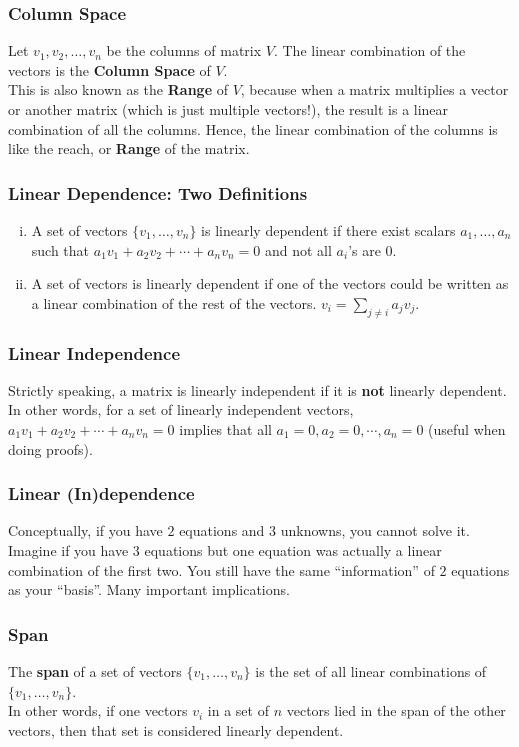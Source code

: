 \documentclass{beamer}
\begin{document}
\begin{frame}
\frametitle{Column Space}
Let $v_1, v_2, \dots, v_n$ be the columns of matrix $V$. The linear combination of the vectors is the \textbf{Column Space} of $V$. \\
This is also known as the \textbf{Range} of $V$, because when a matrix multiplies a vector or another matrix (which is just multiple vectors!), the result is a linear combination of all the columns. Hence, the linear combination of the columns is like the reach, or \textbf{Range} of the matrix.
\end{frame}

\begin{frame}
\frametitle{Linear Dependence: Two Definitions}
\begin{enumerate}[(i)]
\item A set of vectors $\{ v_1, \ldots, v_n \}$ is linearly dependent if there exist scalars $a_1, \ldots, a_n$ such that $a_1 v_1 + a_2 v_2 + \cdots + a_n v_n = 0$ and not all $a_i$'s are $0$.
\item A set of vectors is linearly dependent if one of the vectors could be written as a linear combination of the rest of the vectors. $v_i = \sum_{j \neq i} a_j v_j$.
\end{enumerate}
\end{frame}

\begin{frame}
\frametitle{Linear Independence}
Strictly speaking, a matrix is linearly independent if it is \textbf{not} linearly dependent.\\
In other words, for a set of linearly independent vectors, $a_1 v_1 + a_2 v_2 + \cdots + a_n v_n = 0$ implies that all $a_1 = 0, a_2 = 0, \cdots , a_n = 0$ (useful when doing proofs).
\end{frame}

\begin{frame}
\frametitle{Linear (In)dependence}
Conceptually, if you have $2$ equations and $3$ unknowns, you cannot solve it. Imagine if you have $3$ equations but one equation was actually a linear combination of the first two. You still have the same ``information'' of $2$ equations as your ``basis''. Many important implications.
\end{frame}

\begin{frame}
\frametitle{Span}
The \textbf{span} of a set of vectors $\{v_1, \ldots, v_n\}$ is the set of all linear combinations of $\{v_1, \ldots, v_n\}$.\\
In other words, if one vectors $v_i$ in a set of $n$ vectors lied in the span of the other vectors, then that set is considered linearly dependent.
\end{frame}
\end{document}
